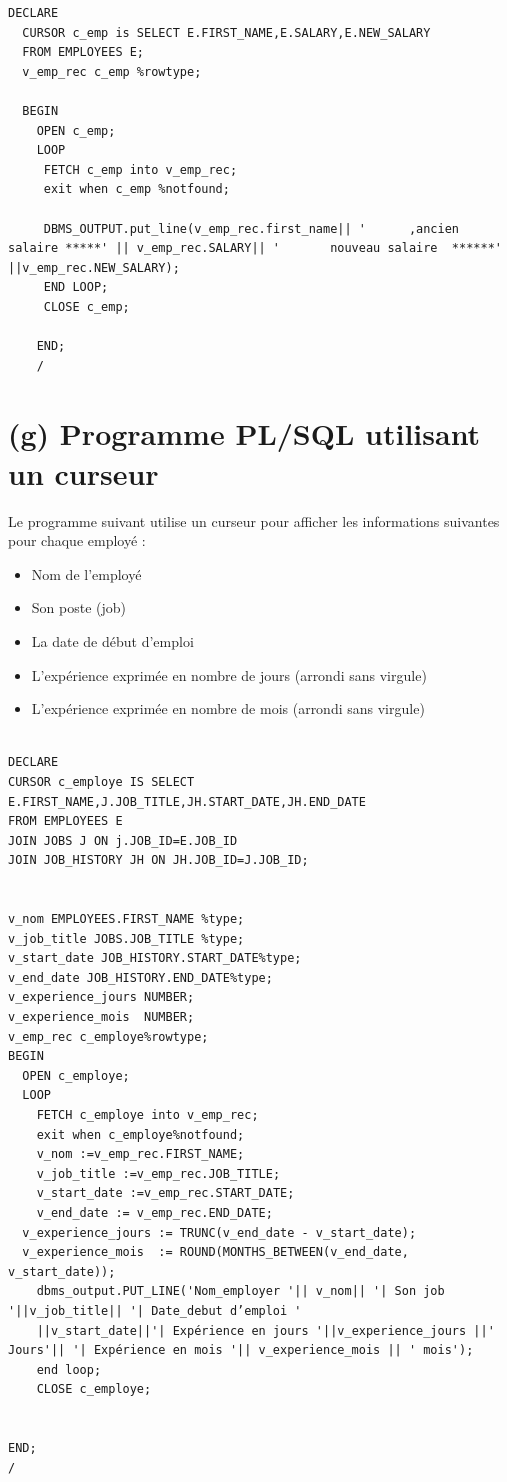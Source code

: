 \documentclass[12pt,a4paper]{article}
\begin{document}
\begin{lstlisting}[style=plsql]
  DECLARE
  CURSOR c_emp is SELECT E.FIRST_NAME,E.SALARY,E.NEW_SALARY
  FROM EMPLOYEES E;
  v_emp_rec c_emp %rowtype;
  
  BEGIN
    OPEN c_emp;
    LOOP
     FETCH c_emp into v_emp_rec;
     exit when c_emp %notfound;
  
     DBMS_OUTPUT.put_line(v_emp_rec.first_name|| '      ,ancien salaire *****' || v_emp_rec.SALARY|| '       nouveau salaire  ******' ||v_emp_rec.NEW_SALARY);
     END LOOP;
     CLOSE c_emp;
  
    END;
    /
  \end{lstlisting}
\newpage
  \section{(g) Programme PL/SQL utilisant un curseur}

  Le programme suivant utilise un curseur pour afficher les informations suivantes pour chaque employé :
  \begin{itemize}
    \item Nom de l'employé
    \item Son poste (job)
    \item La date de début d’emploi
    \item L’expérience exprimée en nombre de jours (arrondi sans virgule)
    \item L’expérience exprimée en nombre de mois (arrondi sans virgule)
  \end{itemize}
  

  \begin{lstlisting}[style=plsql]
  
DECLARE 
CURSOR c_employe IS SELECT E.FIRST_NAME,J.JOB_TITLE,JH.START_DATE,JH.END_DATE
FROM EMPLOYEES E
JOIN JOBS J ON j.JOB_ID=E.JOB_ID
JOIN JOB_HISTORY JH ON JH.JOB_ID=J.JOB_ID;


v_nom EMPLOYEES.FIRST_NAME %type;
v_job_title JOBS.JOB_TITLE %type;
v_start_date JOB_HISTORY.START_DATE%type;
v_end_date JOB_HISTORY.END_DATE%type;
v_experience_jours NUMBER;
v_experience_mois  NUMBER;
v_emp_rec c_employe%rowtype;
BEGIN
  OPEN c_employe;
  LOOP
    FETCH c_employe into v_emp_rec;
    exit when c_employe%notfound;
    v_nom :=v_emp_rec.FIRST_NAME;
    v_job_title :=v_emp_rec.JOB_TITLE;
    v_start_date :=v_emp_rec.START_DATE;
    v_end_date := v_emp_rec.END_DATE;
  v_experience_jours := TRUNC(v_end_date - v_start_date);
  v_experience_mois  := ROUND(MONTHS_BETWEEN(v_end_date, v_start_date));
    dbms_output.PUT_LINE('Nom_employer '|| v_nom|| '| Son job '||v_job_title|| '| Date_debut d’emploi ' 
    ||v_start_date||'| Expérience en jours '||v_experience_jours ||' Jours'|| '| Expérience en mois '|| v_experience_mois || ' mois');
    end loop;
    CLOSE c_employe;


END;
/
    \end{lstlisting}
\end{document}
